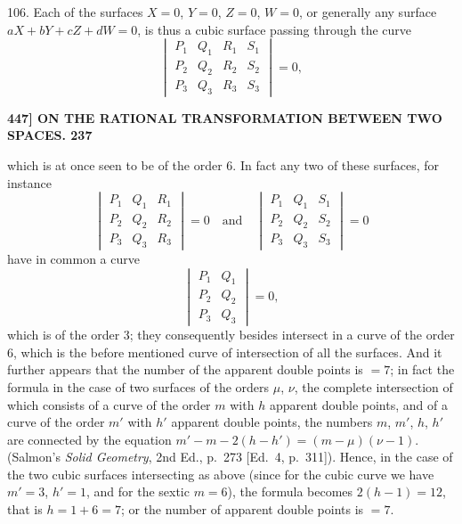 \documentclass[11pt]{article}
\begin{document}
\medskip

106. Each of the surfaces $X = 0$, $Y = 0$, $Z = 0$, $W = 0$, or generally any surface
$aX + bY + cZ + dW = 0$, is thus a cubic surface passing through the curve
\[ \begin{vmatrix} P_1 & Q_1 & R_1 & S_1 \\ P_2 & Q_2 & R_2 & S_2 \\ P_3 & Q_3 & R_3 & S_3 \end{vmatrix} = 0, \]

\medskip
\noindent\textbf{447] \quad ON THE RATIONAL TRANSFORMATION BETWEEN TWO SPACES. \hfill 237}

\medskip

which is at once seen to be of the order 6. In fact any two of these surfaces, for instance
\[ \begin{vmatrix} P_1 & Q_1 & R_1 \\ P_2 & Q_2 & R_2 \\ P_3 & Q_3 & R_3 \end{vmatrix} = 0 \quad \text{and} \quad \begin{vmatrix} P_1 & Q_1 & S_1 \\ P_2 & Q_2 & S_2 \\ P_3 & Q_3 & S_3 \end{vmatrix} = 0 \]
have in common a curve
\[ \begin{vmatrix} P_1 & Q_1 \\ P_2 & Q_2 \\ P_3 & Q_3 \end{vmatrix} = 0, \]
which is of the order 3; they consequently besides intersect in a curve of the order 6,
which is the before mentioned curve of intersection of all the surfaces. And it further
appears that the number of the apparent double points is $=7$; in fact the formula
in the case of two surfaces of the orders $\mu$, $\nu$, the complete intersection of which consists
of a curve of the order $m$ with $h$ apparent double points, and of a curve of the
order $m'$ with $h'$ apparent double points, the numbers $m$, $m'$, $h$, $h'$ are connected by the
equation $m' - m - 2(h - h') = (m - \mu)(\nu - 1)$. (Salmon's \textit{Solid Geometry}, 2nd Ed., p.~273
[Ed.~4, p.~311]). Hence, in the case of the two cubic surfaces intersecting as above (since
for the cubic curve we have $m' = 3$, $h' = 1$, and for the sextic $m = 6$), the formula becomes
$2(h - 1) = 12$, that is $h = 1 + 6 = 7$; or the number of apparent double points is $=7$.

\medskip
\end{document}
